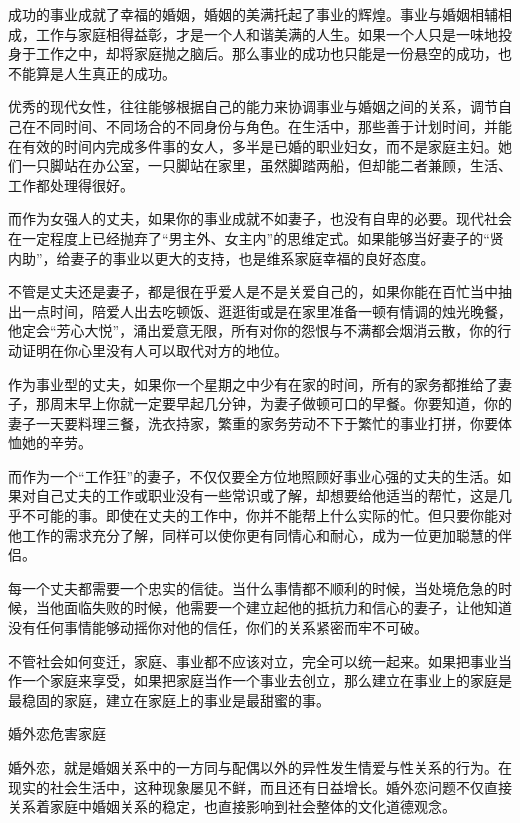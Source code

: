 \documentclass[12pt,UTF8,openany]{ctexbook}
\begin{document}
成功的事业成就了幸福的婚姻，婚姻的美满托起了事业的辉煌。事业与婚姻相辅相成，工作与家庭相得益彰，才是一个人和谐美满的人生。如果一个人只是一味地投身于工作之中，却将家庭抛之脑后。那么事业的成功也只能是一份悬空的成功，也不能算是人生真正的成功。

优秀的现代女性，往往能够根据自己的能力来协调事业与婚姻之间的关系，调节自己在不同时间、不同场合的不同身份与角色。在生活中，那些善于计划时间，并能在有效的时间内完成多件事的女人，多半是已婚的职业妇女，而不是家庭主妇。她们一只脚站在办公室，一只脚站在家里，虽然脚踏两船，但却能二者兼顾，生活、工作都处理得很好。

而作为女强人的丈夫，如果你的事业成就不如妻子，也没有自卑的必要。现代社会在一定程度上已经抛弃了“男主外、女主内”的思维定式。如果能够当好妻子的“贤内助”，给妻子的事业以更大的支持，也是维系家庭幸福的良好态度。

不管是丈夫还是妻子，都是很在乎爱人是不是关爱自己的，如果你能在百忙当中抽出一点时间，陪爱人出去吃顿饭、逛逛街或是在家里准备一顿有情调的烛光晚餐，他定会“芳心大悦”，涌出爱意无限，所有对你的怨恨与不满都会烟消云散，你的行动证明在你心里没有人可以取代对方的地位。

作为事业型的丈夫，如果你一个星期之中少有在家的时间，所有的家务都推给了妻子，那周末早上你就一定要早起几分钟，为妻子做顿可口的早餐。你要知道，你的妻子一天要料理三餐，洗衣持家，繁重的家务劳动不下于繁忙的事业打拼，你要体恤她的辛劳。

而作为一个“工作狂”的妻子，不仅仅要全方位地照顾好事业心强的丈夫的生活。如果对自己丈夫的工作或职业没有一些常识或了解，却想要给他适当的帮忙，这是几乎不可能的事。即使在丈夫的工作中，你并不能帮上什么实际的忙。但只要你能对他工作的需求充分了解，同样可以使你更有同情心和耐心，成为一位更加聪慧的伴侣。

每一个丈夫都需要一个忠实的信徒。当什么事情都不顺利的时候，当处境危急的时候，当他面临失败的时候，他需要一个建立起他的抵抗力和信心的妻子，让他知道没有任何事情能够动摇你对他的信任，你们的关系紧密而牢不可破。

不管社会如何变迁，家庭、事业都不应该对立，完全可以统一起来。如果把事业当作一个家庭来享受，如果把家庭当作一个事业去创立，那么建立在事业上的家庭是最稳固的家庭，建立在家庭上的事业是最甜蜜的事。





婚外恋危害家庭


婚外恋，就是婚姻关系中的一方同与配偶以外的异性发生情爱与性关系的行为。在现实的社会生活中，这种现象屡见不鲜，而且还有日益增长。婚外恋问题不仅直接关系着家庭中婚姻关系的稳定，也直接影响到社会整体的文化道德观念。
\end{document}
